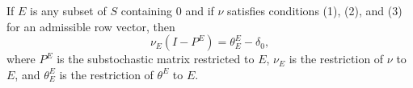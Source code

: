 If $E$ is any subset of $S$ containing $0$ and if $\nu$ satisfies conditions (1), (2), and (3) for an admissible row vector, then
$$\nu_E (I - P^E) = \theta^E_E - \delta_0,$$
where $P^E$ is the substochastic matrix restricted to $E$, $\nu_E$ is the restriction of $\nu$ to $E$, and $\theta^E_E$ is the restriction of $\theta^E$ to $E$.
